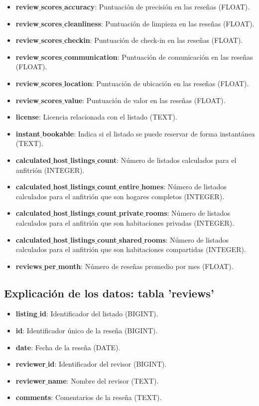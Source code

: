 \begin{itemize}[topsep=0pt, partopsep=0pt, itemsep=0pt, parsep=0pt]
\item \textbf{review$\_$scores$\_$accuracy}: Puntuación de precisión en las reseñas (FLOAT).
\item \textbf{review$\_$scores$\_$cleanliness}: Puntuación de limpieza en las reseñas (FLOAT).
\item \textbf{review$\_$scores$\_$checkin}: Puntuación de check-in en las reseñas (FLOAT).
\item \textbf{review$\_$scores$\_$communication}: Puntuación de comunicación en las reseñas (FLOAT).
\item \textbf{review$\_$scores$\_$location}: Puntuación de ubicación en las reseñas (FLOAT).
\item \textbf{review$\_$scores$\_$value}: Puntuación de valor en las reseñas (FLOAT).
\item \textbf{license}: Licencia relacionada con el listado (TEXT).
\item \textbf{instant$\_$bookable}: Indica si el listado se puede reservar de forma instantánea (TEXT).
\item \textbf{calculated$\_$host$\_$listings$\_$count}: Número de listados calculados para el anfitrión (INTEGER).
\item \textbf{calculated$\_$host$\_$listings$\_$count$\_$entire$\_$homes}: Número de listados calculados para el anfitrión que son hogares completos (INTEGER).
\item \textbf{calculated$\_$host$\_$listings$\_$count$\_$private$\_$rooms}: Número de listados calculados para el anfitrión que son habitaciones privadas (INTEGER).
\item \textbf{calculated$\_$host$\_$listings$\_$count$\_$shared$\_$rooms}: Número de listados calculados para el anfitrión que son habitaciones compartidas (INTEGER).
\item \textbf{reviews$\_$per$\_$month}: Número de reseñas promedio por mes (FLOAT).
\end{itemize}
\subsection*{Explicación de los datos: tabla 'reviews'}

\begin{itemize}[topsep=0pt, partopsep=0pt, itemsep=0pt, parsep=0pt]
\item \textbf{listing$\_$id}: Identificador del listado (BIGINT).
\item \textbf{id}: Identificador único de la reseña (BIGINT).
\item \textbf{date}: Fecha de la reseña (DATE).
\item \textbf{reviewer$\_$id}: Identificador del revisor (BIGINT).
\item \textbf{reviewer$\_$name}: Nombre del revisor (TEXT).
\item \textbf{comments}: Comentarios de la reseña (TEXT).
\end{itemize}

